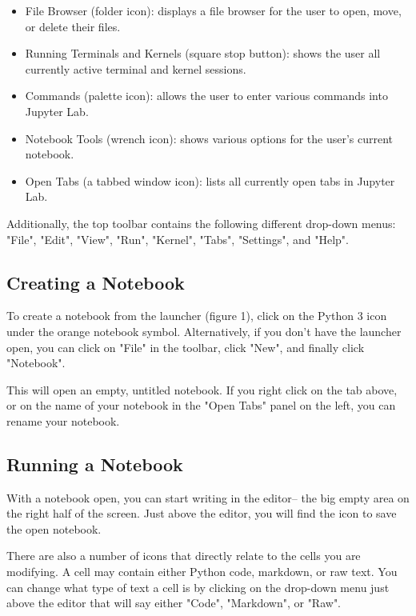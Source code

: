 \documentclass[pdftex,12pt]{artikel3}
\begin{document}
\begin{itemize}
    \item File Browser (folder icon): displays a file browser for the user to open, move, or delete their files.
    \item Running Terminals and Kernels (square stop button): shows the user all currently active terminal and kernel sessions.
    \item Commands (palette icon): allows the user to enter various commands into Jupyter Lab.
    \item Notebook Tools (wrench icon): shows various options for the user's current notebook.
    \item Open Tabs (a tabbed window icon): lists all currently open tabs in Jupyter Lab.
\end{itemize}

Additionally, the top toolbar contains the following different drop-down menus: "File", "Edit", "View", "Run", "Kernel", "Tabs", "Settings", and "Help".

\subsection{Creating a Notebook}

To create a notebook from the launcher (figure 1), click on the Python 3 icon under the orange notebook symbol. Alternatively, if you don't have the launcher open, you can click on "File" in the toolbar, click "New", and finally click "Notebook".

This will open an empty, untitled notebook. If you right click on the tab above, or on the name of your notebook in the "Open Tabs" panel on the left, you can rename your notebook.

\subsection{Running a Notebook}

With a notebook open, you can start writing in the editor-- the big empty area on the right half of the screen. Just above the editor, you will find the icon to save the open notebook.

There are also a number of icons that directly relate to the cells you are modifying. A cell may contain either Python code, markdown, or raw text. You can change what type of text a cell is by clicking on the drop-down menu just above the editor that will say either "Code", "Markdown", or "Raw".
\end{document}
